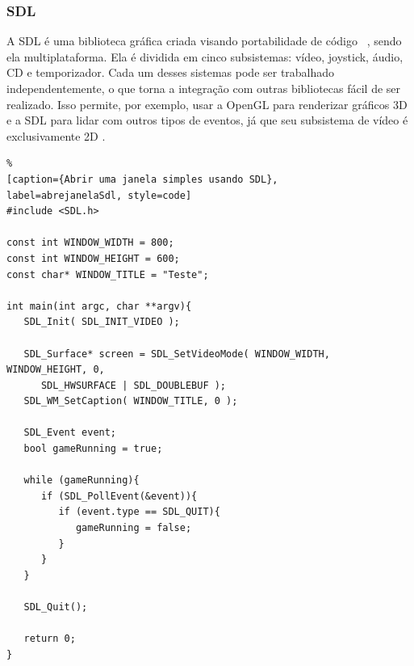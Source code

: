 \subsubsection{SDL}

A  SDL é  uma  biblioteca  gráfica criada  visando  portabilidade de  código ~\cite{guiaSDL}, sendo ela multiplataforma. Ela é dividida  em cinco subsistemas: vídeo, joystick, áudio, CD e temporizador.  Cada um desses sistemas pode ser trabalhado independentemente,  o que  torna a  integração com  outras bibliotecas fácil  de ser realizado. Isso  permite, por exemplo,  usar a OpenGL para renderizar  gráficos 3D e  a SDL para  lidar com outros  tipos de eventos,  já   que  seu  subsistema   de  vídeo  é   exclusivamente  2D \cite{renoartigo}.

\begin{lstlisting}%
[caption={Abrir uma janela simples usando SDL}, 
label=abrejanelaSdl, style=code]
#include <SDL.h>

const int WINDOW_WIDTH = 800;
const int WINDOW_HEIGHT = 600;
const char* WINDOW_TITLE = "Teste";

int main(int argc, char **argv){
   SDL_Init( SDL_INIT_VIDEO );

   SDL_Surface* screen = SDL_SetVideoMode( WINDOW_WIDTH, WINDOW_HEIGHT, 0, 
      SDL_HWSURFACE | SDL_DOUBLEBUF );
   SDL_WM_SetCaption( WINDOW_TITLE, 0 );

   SDL_Event event;
   bool gameRunning = true;

   while (gameRunning){
      if (SDL_PollEvent(&event)){
         if (event.type == SDL_QUIT){
            gameRunning = false;
         }
      } 
   }

   SDL_Quit();

   return 0;
}
\end{lstlisting}



